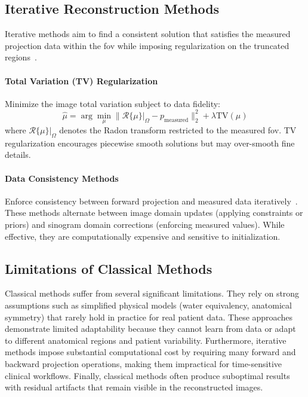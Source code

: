 \subsection{Iterative Reconstruction Methods}

Iterative methods aim to find a consistent solution that satisfies the measured projection data within the \gls{fov} while imposing regularization on the truncated regions~\cite{kudo1991tomographic}.

\paragraph{Total Variation (TV) Regularization} Minimize the image total variation subject to data fidelity:
%
\begin{equation}
\hat{\mu} = \arg\min_{\mu} \|\mathcal{R}\{\mu\}|_{\Omega} - p_{\text{measured}}\|_2^2 + \lambda \text{TV}(\mu)
\end{equation}
%
where $\mathcal{R}\{\mu\}|_{\Omega}$ denotes the Radon transform restricted to the measured \gls{fov}. TV regularization encourages piecewise smooth solutions but may over-smooth fine details.

\paragraph{Data Consistency Methods} Enforce consistency between forward projection and measured data iteratively~\cite{kudo1991tomographic}. These methods alternate between image domain updates (applying constraints or priors) and sinogram domain corrections (enforcing measured values). While effective, they are computationally expensive and sensitive to initialization.

\subsection{Limitations of Classical Methods}

Classical methods suffer from several significant limitations. They rely on strong assumptions such as simplified physical models (water equivalency, anatomical symmetry) that rarely hold in practice for real patient data. These approaches demonstrate limited adaptability because they cannot learn from data or adapt to different anatomical regions and patient variability. Furthermore, iterative methods impose substantial computational cost by requiring many forward and backward projection operations, making them impractical for time-sensitive clinical workflows. Finally, classical methods often produce suboptimal results with residual artifacts that remain visible in the reconstructed images.

